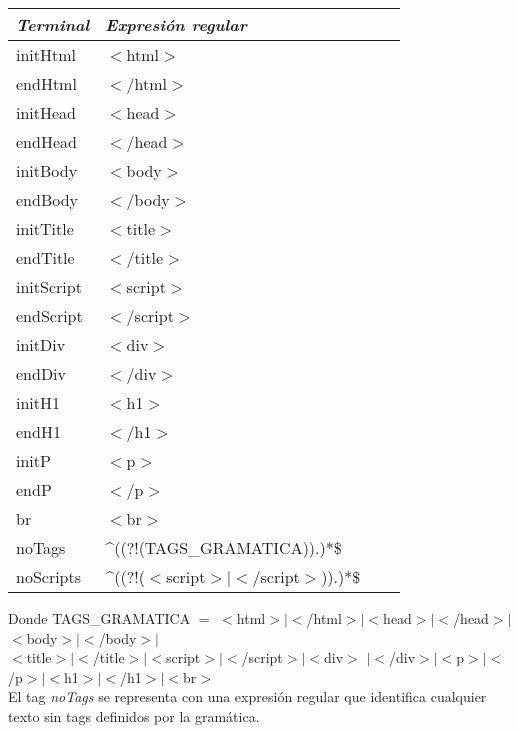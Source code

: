 \begin{center}
    \begin{tabular}{| l | l | l | p{5cm} |}
    \hline
    \textbf{\textit{Terminal}} 	& \textbf{\textit{Expresi\'on regular}} 	\\ \hline
    initHtml 		& $<$html$>$ 			 \\ \hline
    endHtml  		& $<$/html$>$  			 \\ \hline
    initHead		& $<$head$>$ 			 \\ \hline
    endHead	 	& $<$/head$>$ 			 \\ \hline
    initBody 		& $<$body$>$ 			 \\ \hline
    endBody		& $<$/body$>$  			 \\ \hline
    initTitle 		& $<$title$>$ 			 \\ \hline
    endTitle  		& $<$/title$>$ 			 \\ \hline
    initScript		& $<$script$>$ 			 \\ \hline
    endScript		& $<$/script$>$  			 \\ \hline
    initDiv		& $<$div$>$ 			 \\ \hline
    endDiv		&  $<$/div$>$ 			 \\ \hline
    initH1		& $<$h1$>$ 			 \\ \hline
    endH1		& $<$/h1$>$  			 \\ \hline
    initP 		& $<$p$>$ 				 \\ \hline
    endP 		& $<$/p$>$ 				 \\ \hline
    br			&$<$br$>$ 				 \\ \hline
    noTags		& \string^((?!(TAGS\_GRAMATICA)).)*\$  			 \\ \hline
    noScripts 		&  \string^((?!($<$script$>\vert<$/script$>$)).)*\$		 \\ \hline

    \end{tabular}
\end{center} 

Donde TAGS\_GRAMATICA $=$ $<$html$>$$\vert$$<$/html$>$$\vert$$<$head$>$$\vert$$<$/head$>$$\vert$$<$body$>$$\vert$$<$/body$>$$\vert$ \\
\indent \indent $<$title$>$$\vert$$<$/title$>$$\vert$$<$script$>$$\vert$$<$/script$>$$\vert$$<$div$>$
$\vert$$<$/div$>$$\vert$$<$p$>$$\vert$$<$/p$>$$\vert$$<$h1$>$$\vert$$<$/h1$>$$\vert$$<$br$>$\\

El tag \textit{noTags} se representa con una expresi\'on regular que identifica cualquier texto sin tags definidos por la gram\'atica.\\


